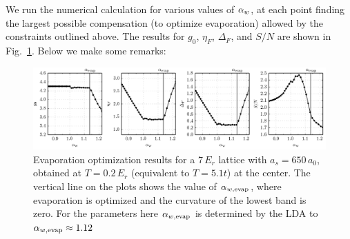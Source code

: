 We run the numerical calculation for various values of
$ \alpha_{w} $, at each point finding the largest possible compensation (to optimize
evaporation) allowed by the constraints outlined above.   The results for
$g_{0}$, $\eta_{F}$, $\Delta_{F}$, and $S/N$ are shown in
Fig.~\ref{fig:optimize_etaF_001}.   Below we make some remarks: 
\begin{figure}
    \centering
\includegraphics[width=\textwidth]{../figures/lda_evap_thesis/001.png}
\caption{\small Evaporation optimization results for a 7\,$E_{r}$ lattice with
$a_{s}=650\,a_{0}$,  obtained at $T=0.2\,E_{r}$ (equivalent to $T=5.1t$) at the
center. The vertical line on the plots shows the value of $ \alpha_{w,\text{evap}} $, where
evaporation is optimized and the curvature of the lowest band is zero.  For the
parameters here $ \alpha_{w,\text{evap}} $ is determined by the LDA to $ \alpha_{w,\text{evap}}  \approx
1.12$}
    \label{fig:optimize_etaF_001}
\end{figure}
